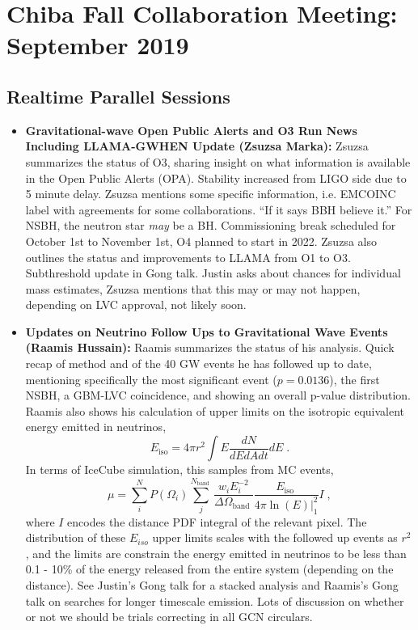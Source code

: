 \chapter{Chiba Fall Collaboration Meeting: September 2019}

\section*{Realtime Parallel Sessions}
\begin{itemize}
    \item \textbf{Gravitational-wave Open Public Alerts and O3 Run News Including LLAMA-GWHEN Update (Zsuzsa Marka):} Zsuzsa summarizes the status of O3, sharing insight on what information is available in the Open Public Alerts (OPA). Stability increased from LIGO side due to 5 minute delay. Zsuzsa mentions some specific information, i.e. EMCOINC label with agreements for some collaborations. ``If it says BBH believe it.'' For NSBH, the neutron star \textit{may} be a BH. Commissioning break scheduled for October 1st to November 1st, O4 planned to start in 2022. Zsuzsa also outlines the status and improvements to LLAMA from O1 to O3. Subthreshold update in Gong talk. Justin asks about chances for individual mass estimates, Zsuzsa mentions that this may or may not happen, depending on LVC approval, not likely soon. 
    \item \textbf{Updates on Neutrino Follow Ups to Gravitational Wave Events (Raamis Hussain):} Raamis summarizes the status of his analysis. Quick recap of method and of the 40 GW events he has followed up to date, mentioning specifically the most significant event ($p= 0.0136$), the first NSBH, a GBM-LVC coincidence, and showing an overall p-value distribution. Raamis also shows his calculation of upper limits on the isotropic equivalent energy emitted in neutrinos, 
    $$ E_{\mathrm{iso}}=4 \pi r^{2} \int E \frac{d N}{d E d A d t} d E\;.$$ In terms of IceCube simulation, this samples from MC events, $$ \mu=\sum_{i}^{N} P\left(\Omega_{i}\right) \sum_{j}^{N_{\text {band }}} \frac{w_{i} E_{i}^{-2}}{\Delta \Omega_{\text {band }}} \frac{E_{\text {iso }}}{ 4 \pi \ln (E) |_{1}^2} I\;,$$ where $I$ encodes the distance PDF integral of the relevant pixel. The distribution of these $E_{iso}$ upper limits scales with the followed up events as $r^2$, and the limits are constrain the energy emitted in neutrinos to be less than 0.1 - 10\% of the energy released from the entire system (depending on the distance). See Justin's Gong talk for a stacked analysis and Raamis's Gong talk on searches for longer timescale emission. Lots of discussion on whether or not we should be trials correcting in all GCN circulars. 

\end{itemize}
